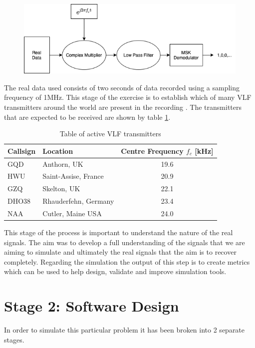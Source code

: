 \begin{figure}[h!]
    \centering
    \includegraphics[width = \textwidth]{figs/method/downconversion.png}
    \caption{}
    \label{fig:my_label}
\end{figure}

The real data used consists of two seconds of data recorded using a sampling frequency of 1\si{\mega\hertz}. This stage of the exercise is to establish which of many VLF transmitters around the world are present in the recording \cite{wikipediaVLF}. The transmitters that are expected to be received are shown by table \ref{tab:vlftransmitters}.

\begin{table}[h!]
\centering
\begin{tabular}{l|l|c}
\textbf{Callsign} & \textbf{Location}    & \textbf{Centre Frequency $f_c$ [kHz]} \\
\hline 
GQD               & Anthorn, UK          & 19.6                            \\
HWU               & Saint-Assise, France & 20.9                            \\
GZQ               & Skelton, UK          & 22.1                            \\
DHO38             & Rhauderfehn, Germany & 23.4                            \\
NAA               & Cutler, Maine USA    & 24.0                             
\end{tabular}
\caption{Table of active VLF transmitters}
\label{tab:vlftransmitters}
\end{table}

This stage of the process is important to understand the nature of the real signals. The aim was to develop a full understanding of the signals that we are aiming to simulate and ultimately the real signals that the aim is to recover completely. Regarding the simulation the output of this step is to create metrics which can be used to help design, validate and improve simulation tools.

\section{Stage 2: Software Design}
In order to simulate this particular problem it has been broken into 2 separate stages.
